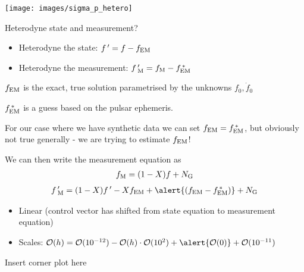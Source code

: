 \documentclass[10pt]{beamer}
\begin{document}
\begin{frame}{}
	\texttt{[image: images/sigma\_p\_hetero]}
	
\end{frame}




\begin{frame}{Heterodyne state and measurement?}
	
	\begin{itemize}
		\item Heterodyne the state: $f \, ' = f - f_{\rm EM}$ 
		\item Heterodyne the measurement: $f \, '_{\rm M}  = f_{\rm M} - f^{\, *}_{\rm EM}$ 
	\end{itemize}
	
	$f_{\rm EM}$ is the exact, true solution parametrised by the unknowns $f_0, \dot{f}_0$
	
	 $f^{\, *}_{\rm EM}$ is a guess based on the pulsar ephemeris. 
	 
	 For our case where we have synthetic data we can set $f_{\rm EM} = f^{\, *}_{\rm EM}$, but obviously not true generally - we are trying to estimate $f_{\rm EM}$!
	
	We can then write the measurement equation as
	\begin{eqnarray}
		f_{\rm M} = (1 - X)f + N_{\rm G} 
	\end{eqnarray}
\begin{eqnarray}
	f \, '_{\rm M} = (1 - X)f \, ' - X f_{\rm EM} + \alert{(f_{\rm EM} - f^{\, *}_{\rm EM})} +  N_{\rm G}
\end{eqnarray}
	
	\begin{itemize}
		\item Linear \checkmark (control vector has shifted from state equation to measurement equation)
		\item Scales: $\mathcal{O}(h) = \mathcal{O}(10^{-12}) - \mathcal{O}(h)\cdot\mathcal{O}(10^2) + \alert{\mathcal{O}(0)} + \mathcal{O}(10^{-11})$ \checkmark
	\end{itemize}
	
	
\end{frame}



\begin{frame}{}
	
Insert corner plot here
	
	
\end{frame}
\end{document}
